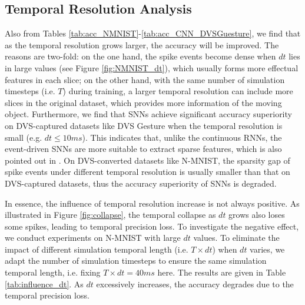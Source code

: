 \documentclass[journal,10pt,twocolumn]{IEEETran}
\begin{document}
\subsection{Temporal Resolution Analysis}\label{sec:generalization}

Also from Tables \ref{tab:acc_NMNIST}-\ref{tab:acc_CNN_DVSGuesture}, we find that as the temporal resolution grows larger, the accuracy will be improved. The reasons are two-fold: on the one hand, the spike events become dense when $dt$ lies in large values (see Figure \ref{fig:NMNIST_dt}), which usually forms more effectual features in each slice; on the other hand, with the same number of simulation timesteps (i.e. $T$) during training, a larger temporal resolution can include more slices in the original dataset, which provides more information of the moving object. Furthermore, we find that SNNs achieve significant accuracy superiority on DVS-captured datasets like DVS Gesture when the temporal resolution is small (e.g. $dt\leq 10ms$). This indicates that, unlike the continuous RNNs, the event-driven SNNs are more suitable to extract sparse features, which is also pointed out in \cite{deng2020rethinking}. On DVS-converted datasets like N-MNIST, the sparsity gap of spike events under different temporal resolution is usually smaller than that on DVS-captured datasets, thus the accuracy superiority of SNNs is degraded.

\begin{table}[!htbp]
\caption{Influence of temporal resolution under the same simulation temporal length.}
\label{tab:influence_dt}
\vspace{2pt}
\centering
\renewcommand\arraystretch{1.3}
\end{table}


In essence, the influence of temporal resolution increase is not always positive. As illustrated in Figure \ref{fig:collapse}, the temporal collapse as $dt$ grows also loses some spikes, leading to temporal precision loss. To investigate the negative effect, we conduct experiments on N-MNIST with large $dt$ values. To eliminate the impact of different simulation temporal length (i.e. $T\times dt$) when $dt$ varies, we adapt the number of simulation timesteps to ensure the same simulation temporal length, i.e. fixing $T\times dt=40ms$ here. The results are given in Table \ref{tab:influence_dt}. As $dt$ excessively increases, the accuracy degrades due to the temporal precision loss.
\end{document}
